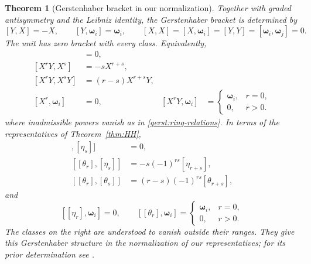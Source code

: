\documentclass[a4paper,11pt,oneside,reqno]{amsart}
\newtheorem{theorem}{Theorem}[section]
\theoremstyle{definition}
\numberwithin{equation}{section}
\begin{document}
\begin{theorem}[Gerstenhaber bracket in our normalization]
\label{gerst:complete-bracket}
Together with graded antisymmetry and the Leibniz identity, the
Gerstenhaber bracket is determined by
\begin{equation}\label{gerst:generator-brackets}
 [Y,X]=-X,\qquad [Y,\boldsymbol\omega_i]=\boldsymbol\omega_i,
 \qquad
 [X,X]=[X,\boldsymbol\omega_i]=[Y,Y]
 = [\boldsymbol\omega_i,\boldsymbol\omega_j]=0.
\end{equation}
The unit has zero bracket with every class.  Equivalently,
\begin{align}
 [X^r,X^s]&=0,\label{gerst:power-even-even}\\
 [X^rY,X^s]&=-sX^{r+s},\label{gerst:power-odd-even}\\
 [X^rY,X^sY]&=(r-s)X^{r+s}Y,\label{gerst:power-odd-odd}\\
 [X^r,\boldsymbol\omega_i]&=0,
 & [X^rY,\boldsymbol\omega_i]&=
 \begin{cases}\boldsymbol\omega_i,&r=0,\\0,&r>0.
 \end{cases}\label{gerst:power-center}
\end{align}
where inadmissible powers vanish as in \eqref{gerst:ring-relations}.
In terms of the representatives of Theorem~\ref{thm:HH},
\begin{align}
 [[\eta_r],[\eta_s]]&=0,\label{gerst:original-even-even}\\
 [[\theta_r],[\eta_s]]&=-s(-1)^{rs}[\eta_{r+s}],
 \label{gerst:original-odd-even}\\
 [[\theta_r],[\theta_s]]&=(r-s)(-1)^{rs}[\theta_{r+s}],
 \label{gerst:original-odd-odd}
\end{align}
and
\begin{equation}\label{gerst:original-center}
 [[\eta_r],\boldsymbol\omega_i]=0,\qquad
 [[\theta_r],\boldsymbol\omega_i]
 =\begin{cases}\boldsymbol\omega_i,&r=0,\\0,&r>0.
 \end{cases}
\end{equation}
The classes on the right are understood to vanish outside their
ranges.  They give this Gerstenhaber structure in the normalization of our
representatives; for its prior determination see \cite{LyuWu}.
\end{theorem}
\end{document}
